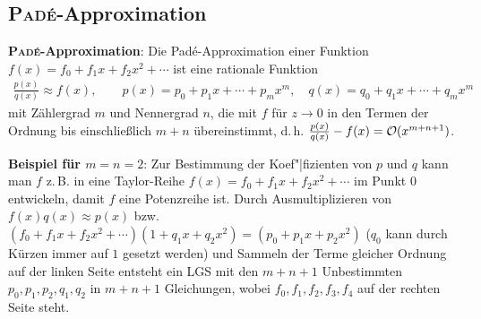 \subsection{%
    \textsc{Padé}-Approximation%
}

\textbf{\textsc{Padé}-Approximation}:
Die Padé-Approximation einer Funktion $f(x) = f_0 + f_1 x + f_2 x^2 + \dotsb$
ist eine rationale Funktion
\begin{align*}
    \frac{p(x)}{q(x)} \approx f(x), \qquad
    p(x) = p_0 + p_1 x + \dotsb + p_m x^m, \quad
    q(x) = q_0 + q_1 x + \dotsb + q_m x^m
\end{align*}
mit Zählergrad $m$ und Nennergrad $n$,
die mit $f$ für $z \to 0$ in den Termen der Ordnung bis einschließlich $m + n$
übereinstimmt, d.\,h. $\frac{p(x)}{q(x)} - f(x) = \operatorname{\mathcal{O}}(x^{m+n+1})$.

\textbf{Beispiel für $m = n = 2$}:
Zur Bestimmung der Koef"|fizienten von $p$ und $q$ kann man $f$ z.\,B. in
eine Taylor-Reihe $f(x) = f_0 + f_1 x + f_2 x^2 + \dotsb$ im Punkt $0$
entwickeln, damit $f$ eine Potenzreihe ist.
Durch Ausmultiplizieren von $f(x) q(x) \approx p(x)$ bzw. \\
$(f_0 + f_1 x + f_2 x^2 + \dotsb) (1 + q_1 x + q_2 x^2) =
(p_0 + p_1 x + p_2 x^2)$ ($q_0$ kann durch Kürzen immer auf $1$ gesetzt werden)
und Sammeln der Terme gleicher Ordnung auf der linken Seite entsteht ein
LGS mit den $m + n + 1$ Unbestimmten $p_0, p_1, p_2, q_1, q_2$
in $m + n + 1$ Gleichungen, wobei $f_0, f_1, f_2, f_3, f_4$ auf der
rechten Seite steht.

\pagebreak
